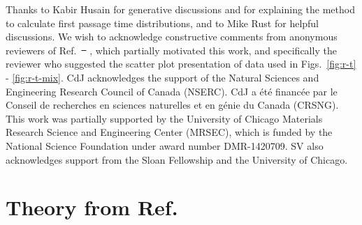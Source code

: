 \documentclass[amsmath, preprintnumbers, 10pt, twocolumn, pre, bibliograpy]{revtex4-1}
\providecommand{\DIFadd}[1]{{\protect\color{blue}\uwave{#1}}} %
\providecommand{\DIFdel}[1]{{\protect\color{red}\sout{#1}}}                      %
\providecommand{\DIFaddbegin}{} %
\providecommand{\DIFaddend}{} %
\providecommand{\DIFdelbegin}{} %
\providecommand{\DIFdelend}{} %
\newcommand{\DIFscaledelfig}{0.5}
\newlength{\DIFdelgraphicswidth} %
\newlength{\DIFdelgraphicsheight} %
\newcommand{\DIFaddincludegraphics}[2][]{{\color{blue}\fbox{\DIFOincludegraphics[#1]{#2}}}} %
\newcommand{\DIFdelincludegraphics}[2][]{%
\sbox{\DIFdelgraphicsbox}{\DIFOincludegraphics[#1]{#2}}%
\settoboxwidth{\DIFdelgraphicswidth}{\DIFdelgraphicsbox} %
\settoboxtotalheight{\DIFdelgraphicsheight}{\DIFdelgraphicsbox} %
\scalebox{\DIFscaledelfig}{%
\parbox[b]{\DIFdelgraphicswidth}{\usebox{\DIFdelgraphicsbox}\\[-\baselineskip] \rule{\DIFdelgraphicswidth}{0em}}\llap{\resizebox{\DIFdelgraphicswidth}{\DIFdelgraphicsheight}{%
\setlength{\unitlength}{\DIFdelgraphicswidth}%
\begin{picture}(1,1)%
\thicklines\linethickness{2pt} %
{\color[rgb]{1,0,0}\put(0,0){\framebox(1,1){}}}%
{\color[rgb]{1,0,0}\put(0,0){\line( 1,1){1}}}%
{\color[rgb]{1,0,0}\put(0,1){\line(1,-1){1}}}%
\end{picture}%
}\hspace*{3pt}}} %
} %
\DeclareRobustCommand{\DIFaddbegin}{\DIFOaddbegin \let\includegraphics\DIFaddincludegraphics} %
\DeclareRobustCommand{\DIFaddend}{\DIFOaddend \let\includegraphics\DIFOincludegraphics} %
\DeclareRobustCommand{\DIFdelbegin}{\DIFOdelbegin \let\includegraphics\DIFdelincludegraphics} %
\DeclareRobustCommand{\DIFdelend}{\DIFOaddend \let\includegraphics\DIFOincludegraphics} %
\begin{document}
\begin{acknowledgments}

Thanks to Kabir Husain for generative discussions and for explaining the method to calculate first passage time distributions, and to Mike Rust for helpful discussions. We wish to acknowledge constructive comments from anonymous reviewers of Ref.~\DIFdelbegin \DIFdel{\mbox{%
\cite{DelJunco2018b}}%
}\DIFdelend \DIFaddbegin \DIFadd{\mbox{%
\citenum{DelJunco2018b}}%
}\DIFaddend , which partially motivated this work, and specifically the reviewer who suggested the scatter plot presentation of data used in Figs.~\ref{fig:r-t} - \ref{fig:r-t-mix}. CdJ acknowledges the support of the Natural Sciences and Engineering Research Council of Canada (NSERC). CdJ a \'et\'e financ\'ee par le Conseil de recherches en sciences naturelles et en g\'enie du Canada (CRSNG). This work was partially supported by the University of Chicago Materials Research Science and Engineering Center (MRSEC), which is funded by the National Science Foundation under award number DMR-1420709.  SV also acknowledges support from the Sloan Fellowship and the University of Chicago.

\end{acknowledgments}


\appendix

\section{Theory from Ref.~}\label{app:theory}
\end{document}
